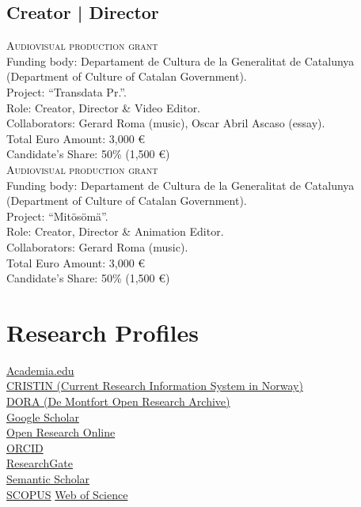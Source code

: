 \documentclass[10pt, a4paper]{article}
\newcommand{\years}[1]{\marginnote{\scriptsize #1}}
\begin{document}
{\subsection*{Creator | Director}

\years{09/2001--08/2002}\textsc{Audiovisual production grant} \\
Funding body: Departament de Cultura de la Generalitat de Catalunya (Department of Culture of Catalan Government).\\
Project: ``Transdata Pr.''.  \\
Role: Creator, Director \& Video Editor.\\
Collaborators: Gerard Roma (music), Oscar Abril Ascaso (essay). \\
Total Euro Amount: 3,000 \euro\\ 
Candidate’s Share: 50\% (1,500 \euro)\\[0.5cm]%

\years{09/1998--08/1999}\textsc{Audiovisual production grant} \\
Funding body: Departament de Cultura de la Generalitat de Catalunya (Department of Culture of Catalan Government).\\
Project: ``Mitösömä''.  \\
Role: Creator, Director \& Animation Editor.\\
Collaborators: Gerard Roma (music). \\
Total Euro Amount: 3,000 \euro\\
Candidate’s Share: 50\% (1,500 \euro)



\section*{Research Profiles}
\noindent

\textbullet \- \href{http://open.academia.edu/AnnaXambo}{Academia.edu}\\
\textbullet \- \href{https://app.cristin.no/persons/show.jsf?id=997893}{CRISTIN (Current Research Information System in Norway)}\\
\textbullet \- \href{https://dora.dmu.ac.uk/browse?type=author&value=Xambo,\%20Anna}{DORA (De Montfort Open Research Archive)}\\
\textbullet \- \href{https://scholar.google.com/citations?user=yi3WXM8AAAAJ}{Google Scholar}\\
\textbullet \- \href{http://oro.open.ac.uk/view/person/ax22.html}{Open Research Online}\\
\textbullet \- \href{https://orcid.org/0000-0003-2333-6941}{ORCID}\\
\textbullet \- \href{http://www.researchgate.net/profile/Anna_Xambo}{ResearchGate}\\
\textbullet \- \href{https://www.semanticscholar.org/author/Anna-Xamb\%C3\%B3/1915531}{Semantic Scholar}\\
\textbullet \- \href{https://www.scopus.com/authid/detail.uri?authorId=36642886000}{SCOPUS}
\textbullet \- \href{https://publons.com/researcher/3980818/anna-xambo}{Web of Science}

}
\end{document}
